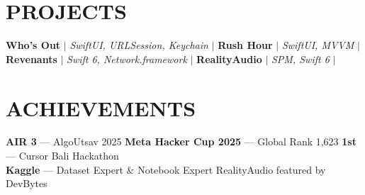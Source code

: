 \section{PROJECTS}
    \resumeSubHeadingListStart
        \resumeProjectHeading
          {\textbf{Who's Out} $|$ \emph{SwiftUI, URLSession, Keychain} $|$ \href{https://github.com/bhanage-viraj/Whos-Out}{} \hspace{2pt} \href{https://testflight.apple.com/join/avevSG7f}{}}{}
          \resumeItemListStart
          \resumeItemListEnd
        \resumeProjectHeading
          {\textbf{Rush Hour} $|$ \emph{SwiftUI, MVVM} $|$ \href{https://github.com/bhanage-viraj/RushHour}{}}{}
          \resumeItemListStart
          \resumeItemListEnd
        \resumeProjectHeading
          {\textbf{Revenants} $|$ \emph{Swift 6, Network.framework} $|$ \href{https://github.com/bhanage-viraj/Split-Mechanics}{}}{}
          \resumeItemListStart
          \resumeItemListEnd
        \resumeProjectHeading
          {\textbf{RealityAudio} $|$ \emph{SPM, Swift 6} $|$ \href{https://github.com/bhanage-viraj/RealityAudio}{}}{}
          \resumeItemListStart
          \resumeItemListEnd
    \resumeSubHeadingListEnd

\section{ACHIEVEMENTS}
 \begin{itemize}[leftmargin=0in, label={}, itemsep=0pt, topsep=1pt]
    \small{\item{
     \textbf{AIR 3} --- AlgoUtsav 2025 \hspace{8pt} \textbf{Meta Hacker Cup 2025} --- Global Rank 1,623 \hspace{8pt} \textbf{1st} --- Cursor Bali Hackathon \\
     \textbf{Kaggle} --- Dataset Expert \& Notebook Expert \hspace{8pt} RealityAudio featured by DevBytes
    }}
 \end{itemize}

